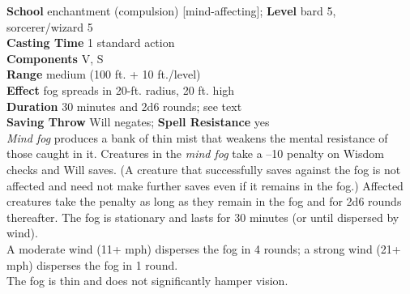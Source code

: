 \textbf{School} enchantment (compulsion) [mind-affecting]; \textbf{Level} bard 5, sorcerer/wizard 5\\
\textbf{Casting Time} 1 standard action\\
\textbf{Components} V, S\\
\textbf{Range }medium (100 ft. + 10 ft./level)\\
\textbf{Effect} fog spreads in 20-ft. radius, 20 ft. high\\
\textbf{Duration} 30 minutes and 2d6 rounds; see text\\
\textbf{Saving Throw }Will negates; \textbf{Spell Resistance} yes\\
\textit{Mind fog }produces a bank of thin mist that weakens the mental resistance of those caught in it. Creatures in the \textit{mind fog }take a –10 penalty on Wisdom checks and Will saves. (A creature that successfully saves against the fog is not affected and need not make further saves even if it remains in the fog.) Affected creatures take the penalty as long as they remain in the fog and for 2d6 rounds thereafter. The fog is stationary and lasts for 30 minutes (or until dispersed by wind).\\
A moderate wind (11+ mph) disperses the fog in 4 rounds; a strong wind (21+ mph) disperses the fog in 1 round.\\
The fog is thin and does not significantly hamper vision.\\
